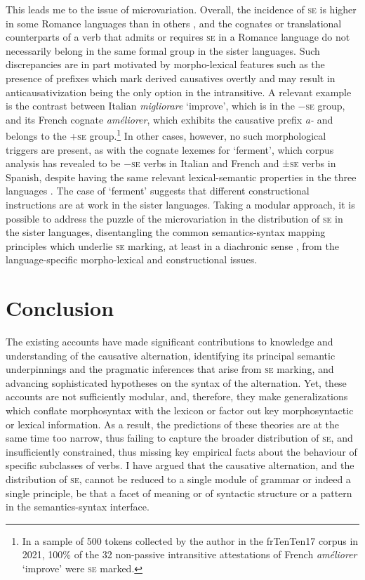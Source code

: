 \documentclass[output=paper,colorlinks,citecolor=brown
]{langscibook}
\begin{document}
This leads me to the issue of microvariation. Overall, the incidence of \textsc{se} is higher in some Romance languages than in others \citep{heidinger2015causalness}, and the cognates or translational counterparts of a verb that admits or requires \textsc{se} in a Romance language do not necessarily belong in the same formal group in the sister languages. Such discrepancies are in part motivated by morpho-lexical features such as the presence of prefixes which mark derived causatives overtly and may result in anticausativization being the only option in the intransitive. A relevant example is the contrast between Italian \textit{migliorare} ‘improve’, which is in the \mbox{−\textsc{se}} group, and its French cognate \textit{améliorer}, which exhibits the causative prefix \textit{a-} and belongs to the +\textsc{se} group.\footnote{In a sample of 500 tokens collected by the author in the frTenTen17 corpus \citep{jakubicek2013tenten} in 2021, 100\% of the 32 non-passive intransitive attestations of French \textit{améliorer} ‘improve’ were \textsc{se} marked.}  In other cases, however, no such morphological triggers are present, as with the cognate lexemes for ‘ferment’, which corpus analysis has revealed to be −\textsc{se} verbs in Italian and French and ±\textsc{se} verbs in Spanish, despite having the same relevant lexical-semantic properties in the three languages \citep{bentley2023internally}. The case of ‘ferment’ suggests that different constructional instructions are at work in the sister languages. Taking a modular approach, it is possible to address the puzzle of the microvariation in the distribution of \textsc{se} in the sister languages, disentangling the common semantics-syntax mapping principles which underlie \textsc{se} marking, at least in a diachronic sense \citep{cennamo1995patterns}, from the language-specific morpho-lexical and constructional issues. 

\section{Conclusion}
\label{bentley_section_6}
The existing accounts have made significant contributions to knowledge and understanding of the causative alternation, identifying its principal semantic underpinnings and the pragmatic inferences that arise from \textsc{se} marking, and advancing sophisticated hypotheses on the syntax of the alternation. Yet, these accounts are not sufficiently modular, and, therefore, they make generalizations which conflate morphosyntax with the lexicon or factor out key morphosyntactic or lexical information.  As a result, the predictions of these theories are at the same time too narrow, thus failing to capture the broader distribution of \textsc{se}, and insufficiently constrained, thus missing key empirical facts about the behaviour of specific subclasses of verbs. I have argued that the causative alternation, and the distribution of \textsc{se}, cannot be reduced to a single module of grammar or indeed a single principle, be that a facet of meaning or of syntactic structure or a pattern in the semantics-syntax interface. 
\end{document}
